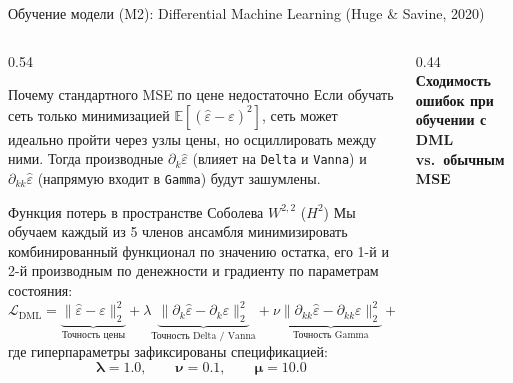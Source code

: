 \documentclass[aspectratio=169, 9pt]{beamer}
\begin{document}
\begin{frame}{Обучение модели (M2): Differential Machine Learning (Huge \& Savine, 2020)}
  \begin{columns}[T]
    \begin{column}{0.54\textwidth}
      \begin{block}{Почему стандартного MSE по цене недостаточно}
        Если обучать сеть только минимизацией $\mathbb{E}[(\hat{\varepsilon} - \varepsilon)^2]$, сеть может идеально пройти через узлы цены, но осциллировать между ними. Тогда производные $\partial_k \hat{\varepsilon}$ (влияет на \texttt{Delta} и \texttt{Vanna}) и $\partial_{kk} \hat{\varepsilon}$ (напрямую входит в \texttt{Gamma}) будут зашумлены.
      \end{block}

      \begin{exampleblock}{Функция потерь в пространстве Соболева $W^{2,2}$ ($H^2$)}
        Мы обучаем каждый из 5 членов ансамбля минимизировать комбинированный функционал по значению остатка, его 1-й и 2-й производным по денежности и градиенту по параметрам состояния:
        $$\mathcal{L}_{\text{DML}} =
          \underbrace{\|\hat{\varepsilon} - \varepsilon\|_2^2}_{\text{Точность цены}}
          + \lambda \underbrace{\|\partial_k \hat{\varepsilon} - \partial_k \varepsilon\|_2^2}_{\text{Точность Delta / Vanna}}
          + \nu \underbrace{\|\partial_{kk} \hat{\varepsilon} - \partial_{kk} \varepsilon\|_2^2}_{\text{Точность Gamma}}
          + \mu \underbrace{\|\nabla_{\bm{\theta}} \hat{\varepsilon} - \nabla_{\bm{\theta}} \varepsilon\|_2^2}_{\text{Точность Vega / Corr}}$$
        где гиперпараметры зафиксированы спецификацией:
        $$\bm{\lambda = 1.0, \qquad \nu = 0.1, \qquad \mu = 10.0}$$
      \end{exampleblock}
    \end{column}

    \begin{column}{0.44\textwidth}
      \centering
      \textbf{\scriptsize Сходимость ошибок при обучении с DML vs.\ обычным MSE}\\[0.2em]
\end{column}
\end{columns}
\end{frame}
\end{document}
